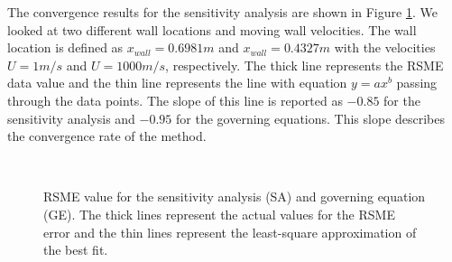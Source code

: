 The convergence results for the sensitivity analysis are shown in Figure \ref{fig:C4_virtualBoundarySAconvergence}. We looked at two different wall locations and moving wall velocities. The wall location is defined as $x_{wall} = 0.6981 m$ and $x_{wall} = 0.4327 m$ with the velocities $U = 1 m/s$ and $U = 1000 m/s$, respectively. The thick line represents the RSME data value and the thin line represents the line with equation $y = ax^b$ passing through the data points. The slope of this line is reported as $-0.85$ for the sensitivity analysis and $-0.95$ for the governing equations. This slope describes the convergence rate of the method.
%
\begin{figure}[H]
    \centering
    \\
    \caption{RSME value for the sensitivity analysis (SA) and governing equation (GE). The thick lines represent the actual values for the RSME error and the thin lines represent the least-square approximation of the best fit.}
    \label{fig:C4_virtualBoundarySAconvergence}
\end{figure}
